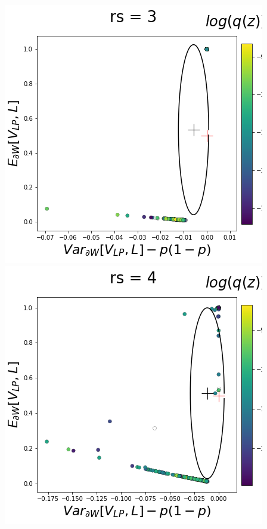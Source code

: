 \documentclass[11pt]{article}
\begin{document}
\begin{center}
\includegraphics[scale=0.33]{figs/T_x_SC_reduced_c=15_p=50_rs=3.png} \\
\includegraphics[scale=0.33]{figs/T_x_SC_reduced_c=15_p=50_rs=4.png}

\end{center}
\end{document}
